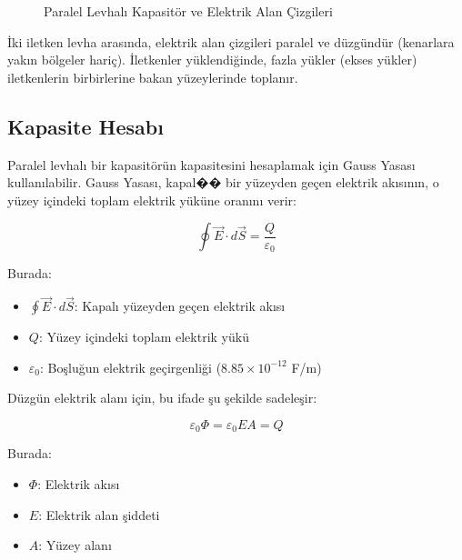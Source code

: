\documentclass[12pt,a4paper]{fenbil}
\begin{document}
\begin{figure}[H]
    \centering
    \caption{Paralel Levhalı Kapasitör ve Elektrik Alan Çizgileri}
\end{figure}

İki iletken levha arasında, elektrik alan çizgileri paralel ve düzgündür (kenarlara yakın bölgeler hariç). İletkenler yüklendiğinde, fazla yükler (ekses yükler) iletkenlerin birbirlerine bakan yüzeylerinde toplanır.

\subsection{Kapasite Hesabı}

Paralel levhalı bir kapasitörün kapasitesini hesaplamak için Gauss Yasası kullanılabilir. Gauss Yasası, kapal�� bir yüzeyden geçen elektrik akısının, o yüzey içindeki toplam elektrik yüküne oranını verir:

\begin{equation}
\oint \vec{E} \cdot d\vec{S} = \frac{Q}{\varepsilon_0}
\end{equation}

Burada:
\begin{itemize}
    \item $\oint \vec{E} \cdot d\vec{S}$: Kapalı yüzeyden geçen elektrik akısı
    \item $Q$: Yüzey içindeki toplam elektrik yükü
    \item $\varepsilon_0$: Boşluğun elektrik geçirgenliği ($8.85 \times 10^{-12}$ F/m)
\end{itemize}

Düzgün elektrik alanı için, bu ifade şu şekilde sadeleşir:

\begin{equation}
\varepsilon_0 \Phi = \varepsilon_0 E A = Q
\end{equation}

Burada:
\begin{itemize}
    \item $\Phi$: Elektrik akısı
    \item $E$: Elektrik alan şiddeti
    \item $A$: Yüzey alanı
\end{itemize}
\end{document}
